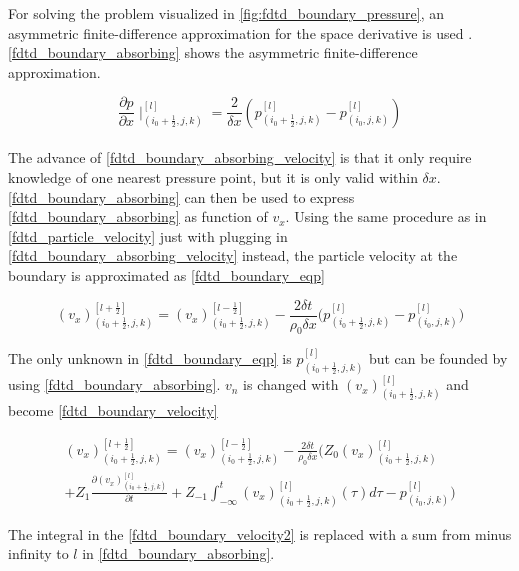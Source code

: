 For solving the problem visualized in \autoref{fig:fdtd_boundary_pressure}, an asymmetric finite-difference approximation for the space derivative is used  \citep{finiteproblems}. \autoref{fdtd_boundary_absorbing} shows the asymmetric finite-difference approximation.

\begin{equation}\label{fdtd_boundary_absorbing_velocity}
\frac{\partial p}{\partial x}\mid _{(i_0+\frac{1}{2},j,k)}^{[l]} = \frac{2}{\delta x} \left( p_{(i_0+\frac{1}{2},j,k)}^{[l]}-p_{(i_0,j,k)}^{[l]} \right)
\end{equation}\\

The advance of \autoref{fdtd_boundary_absorbing_velocity} is that it only require knowledge of one nearest pressure point, but it is only valid within $\delta x$. \autoref{fdtd_boundary_absorbing} can then be used to express  \autoref{fdtd_boundary_absorbing} as function of $v_x$. Using the same procedure as in \autoref{fdtd_particle_velocity} just with plugging in \autoref{fdtd_boundary_absorbing_velocity} instead, the particle velocity at the boundary is approximated as \autoref{fdtd_boundary_eqp}

\begin{equation}\label{fdtd_boundary_eqp}
(v_x)_{(i_0+\frac{1}{2},j,k)}^{[l+\frac{1}{2}]}= (v_x)_{(i_0+\frac{1}{2},j,k)}^{[l-\frac{1}{2}]}-\frac{2 \delta t}{\rho_0 \delta x} \Biggl( 
p_{(i_0+\frac{1}{2},j,k)}^{[l]} -p_{(i_0,j,k)}^{[l]}  \Biggr)
\end{equation}

The only unknown in \autoref{fdtd_boundary_eqp} is $p_{(i_0+\frac{1}{2},j,k)}^{[l]}$ but can be founded by using \autoref{fdtd_boundary_absorbing}. $v_n$ is changed with $(v_x)_{(i_0+\frac{1}{2},j,k)}^{[l]}$ and become \autoref{fdtd_boundary_velocity}


\begin{multline}\label{fdtd_boundary_velocity}
(v_x)_{(i_0+\frac{1}{2},j,k)}^{[l+\frac{1}{2}]}= (v_x)_{(i_0+\frac{1}{2},j,k)}^{[l-\frac{1}{2}]}-\frac{2 \delta t}{\rho_0 \delta x} \Biggl( 
 Z_0(v_x)_{(i_0+\frac{1}{2},j,k)}^{[l]} \\
 +Z_1 \frac{\partial (v_x)_{(i_0+\frac{1}{2},j,k)}^{[l]}}{\partial t} +Z_{-1} \int_{-\infty}^{t} (v_x)_{(i_0+\frac{1}{2},j,k)}^{[l]}(\tau)d\tau -p_{(i_0,j,k)}^{[l]}
\Biggr)
\end{multline}

The integral in the \autoref{fdtd_boundary_velocity2} is replaced with a sum from minus infinity to $l$ in \autoref{fdtd_boundary_absorbing}.

